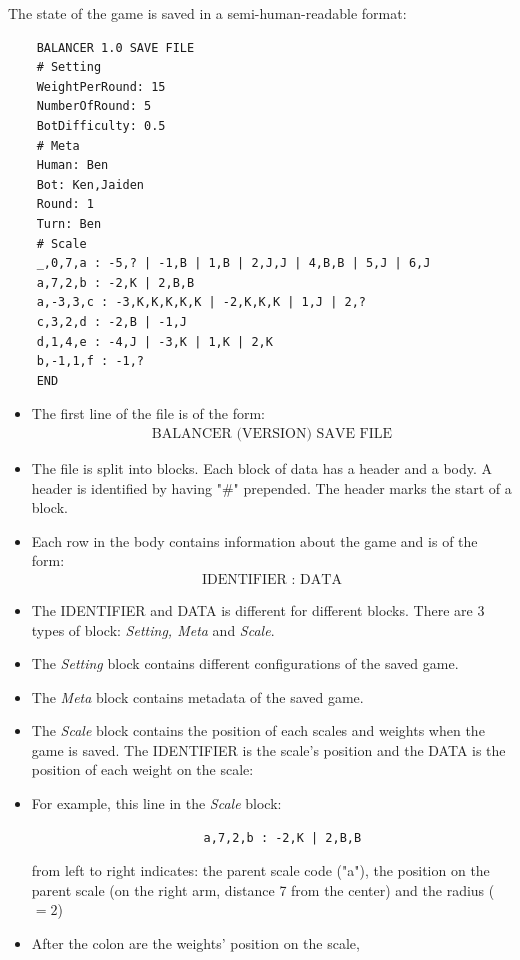 \documentclass[12pt]{article}
\begin{document}
The state of the game is saved in a semi-human-readable format:

\begin{verbatim}
    BALANCER 1.0 SAVE FILE
    # Setting
    WeightPerRound: 15
    NumberOfRound: 5
    BotDifficulty: 0.5
    # Meta
    Human: Ben
    Bot: Ken,Jaiden
    Round: 1
    Turn: Ben
    # Scale
    _,0,7,a : -5,? | -1,B | 1,B | 2,J,J | 4,B,B | 5,J | 6,J
    a,7,2,b : -2,K | 2,B,B
    a,-3,3,c : -3,K,K,K,K,K | -2,K,K,K | 1,J | 2,?
    c,3,2,d : -2,B | -1,J
    d,1,4,e : -4,J | -3,K | 1,K | 2,K
    b,-1,1,f : -1,?
    END
\end{verbatim}

\begin{itemize}
  \item The first line of the file is of the form: 
    \begin{align*}
      \text{BALANCER (VERSION) SAVE FILE}
    \end{align*}
  \item The file is split into blocks. Each block of data has a header and a
    body. A header is identified by having "\#" prepended. The header marks the
    start of a block.
  \item Each row in the body contains information about the game and is of the
    form:
    \begin{align*}
      \text{IDENTIFIER : DATA}
    \end{align*}
    \item The IDENTIFIER and DATA is different for different blocks.  There are
      3 types of block: \textit{Setting, Meta} and \textit{Scale}.
  \item The \textit{Setting} block contains different configurations of the saved game.
  \item The \textit{Meta} block contains metadata of the saved game. 
  \item The \textit{Scale} block contains the position of each scales and weights when
    the game is saved. The IDENTIFIER is the scale's position and the DATA is
    the position of each weight on the scale:
  \item For example, this line in the \textit{Scale}  block:
    \begin{verbatim}
                        a,7,2,b : -2,K | 2,B,B
    \end{verbatim}
    from left to right indicates: the parent scale code ("a"), the position on
    the parent scale (on the right arm, distance 7 from the center) and the
    radius ($=2$) \item After the colon are the weights' position on the scale,

\end{itemize}
\end{document}
